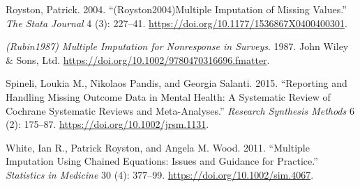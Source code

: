 \documentclass{article}
\newlength{\cslhangindent}
\newenvironment{CSLReferences}[2] %
 {\begin{list}{}{%
  \setlength{\itemindent}{0pt}
  \setlength{\leftmargin}{0pt}
  \setlength{\parsep}{0pt}
  \ifodd #1
   \setlength{\leftmargin}{\cslhangindent}
   \setlength{\itemindent}{-1\cslhangindent}
  \fi
  \setlength{\itemsep}{#2\baselineskip}}}
 {\end{list}}
\begin{document}
\begin{CSLReferences}{1}{0}
Royston, Patrick. 2004. {``({Royston2004}){Multiple} {Imputation} of
{Missing} {Values}.''} \emph{The Stata Journal} 4 (3): 227--41.
\url{https://doi.org/10.1177/1536867X0400400301}.

\emph{({Rubin1987}) {Multiple} {Imputation} for {Nonresponse} in
{Surveys}}. 1987. John Wiley \& Sons, Ltd.
\url{https://doi.org/10.1002/9780470316696.fmatter}.

Spineli, Loukia M., Nikolaos Pandis, and Georgia Salanti. 2015.
{``Reporting and Handling Missing Outcome Data in Mental Health: A
Systematic Review of {Cochrane} Systematic Reviews and Meta-Analyses.''}
\emph{Research Synthesis Methods} 6 (2): 175--87.
\url{https://doi.org/10.1002/jrsm.1131}.

White, Ian R., Patrick Royston, and Angela M. Wood. 2011. {``Multiple
Imputation Using Chained Equations: {Issues} and Guidance for
Practice.''} \emph{Statistics in Medicine} 30 (4): 377--99.
\url{https://doi.org/10.1002/sim.4067}.

\end{CSLReferences}



\end{document}
